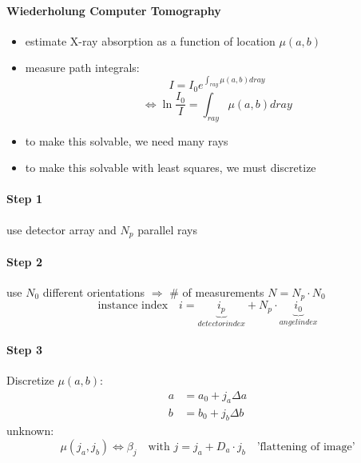 \documentclass[11pt]{article}
\begin{document}
      \paragraph{Wiederholung Computer Tomography}
      \begin{itemize}
        \item estimate X-ray absorption as a function of location $\mu(a, b)$
        \item measure path integrals:
        \begin{equation*}
          I = I_0 e^{\int_{ray} \mu(a,b) dray}
        \end{equation*}
        \begin{equation*}
          \iff \ln \frac{I_0}{I} = \int_{ray} \mu(a, b) dray
        \end{equation*}
        \item to make this solvable, we need many rays
        \item to make this solvable with least squares, we must discretize
      \end{itemize}
      \paragraph{Step 1} use detector array and $N_p$ parallel rays
      \paragraph{Step 2} use $N_0$ different orientations
      $\Rightarrow$ $\#$ of measurements $N=N_p \cdot N_0$
      \begin{equation*}
        \text{instance index} \quad i = \underbrace{i_p}_{detector index} + N_p
        \cdot \underbrace{i_0}_{angel index}
      \end{equation*}
      \paragraph{Step 3} Discretize $\mu(a,b)$:
      \begin{equation*}
        \begin{align*}
          a &= a_0 + j_a \Delta a \\
          b &= b_0 + j_b \Delta b
        \end{align*}
      \end{equation*}
      unknown:
      \begin{equation*}
        \mu(j_a, j_b) \iff \beta_j \quad \text{with } j = j_a + D_a \cdot j_b \quad
        \text{'flattening of image'}
      \end{equation*}
\end{document}
